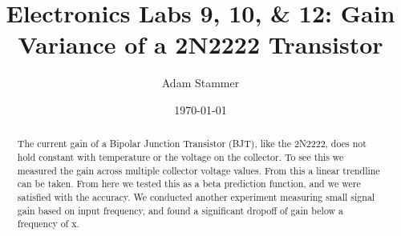 \documentclass[prb,preprint]{revtex4-1}
\begin{document}
\title{Electronics Labs 9, 10, & 12: Gain Variance of a 2N2222 Transistor}
\author{Adam Stammer}

\date{\today}

\begin{abstract}
The current gain of a Bipolar Junction Transistor (BJT), like the 2N2222, does not hold constant with temperature or the voltage on the collector. To see this we measured the gain across multiple collector voltage values. From this a linear trendline can be taken. From here we tested this as a beta prediction function, and we were satisfied with the accuracy. We conducted another experiment measuring small signal gain based on input frequency, and found a significant dropoff of gain below a frequency of x. 
\end{abstract}

\maketitle


%
%
%
%
%
%
%
%
\end{document}
